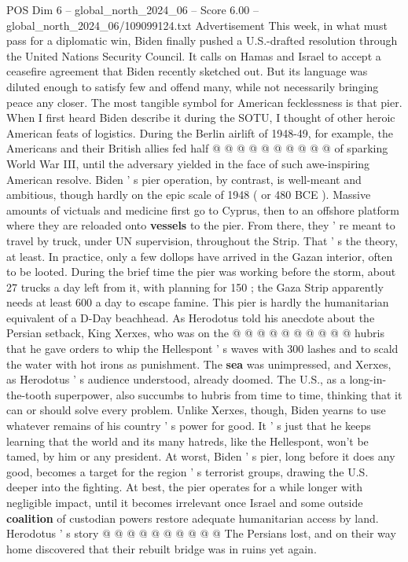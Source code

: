 \begin{textsample}{POS Dim 6 – global\_north\_2024\_06 – Score 6.00 – global\_north\_2024\_06/109099124.txt}
Advertisement This week, in what must pass for a diplomatic win, Biden finally pushed a U.S.-drafted resolution through the United Nations Security Council.
It calls on Hamas and Israel to accept a ceasefire agreement that Biden recently sketched out.
But its language was diluted enough to satisfy few and offend many, while not necessarily bringing peace any closer.
The most tangible symbol for American fecklessness is that pier.
When I first heard Biden describe it during the SOTU, I thought of other heroic American feats of logistics.
During the Berlin airlift of 1948-49, for example, the Americans and their British allies fed half @ @ @ @ @ @ @ @ @ @ of sparking World War III, until the adversary yielded in the face of such awe-inspiring American resolve.
Biden ' s pier operation, by contrast, is well-meant and ambitious, though hardly on the epic scale of 1948 ( or 480 BCE ).
Massive amounts of victuals and medicine first go to Cyprus, then to an offshore platform where they are reloaded onto \textbf{vessels} to the pier.
From there, they ' re meant to travel by truck, under UN supervision, throughout the Strip.
That ' s the theory, at least.
In practice, only a few dollops have arrived in the Gazan interior, often to be looted.
During the brief time the pier was working before the storm, about 27 trucks a day left from it, with planning for 150 ; the Gaza Strip apparently needs at least 600 a day to escape famine.
This pier is hardly the humanitarian equivalent of a D-Day beachhead.
As Herodotus told his anecdote about the Persian setback, King Xerxes, who was on the @ @ @ @ @ @ @ @ @ @ hubris that he gave orders to whip the Hellespont ' s waves with 300 lashes and to scald the water with hot irons as punishment.
The \textbf{sea} was unimpressed, and Xerxes, as Herodotus ' s audience understood, already doomed.
The U.S., as a long-in-the-tooth superpower, also succumbs to hubris from time to time, thinking that it can or should solve every problem.
Unlike Xerxes, though, Biden yearns to use whatever remains of his country ' s power for good.
It ' s just that he keeps learning that the world and its many hatreds, like the Hellespont, won't be tamed, by him or any president.
At worst, Biden ' s pier, long before it does any good, becomes a target for the region ' s terrorist groups, drawing the U.S. deeper into the fighting.
At best, the pier operates for a while longer with negligible impact, until it becomes irrelevant once Israel and some outside \textbf{coalition} of custodian powers restore adequate humanitarian access by land.
Herodotus ' s story @ @ @ @ @ @ @ @ @ @ The Persians lost, and on their way home discovered that their rebuilt bridge was in ruins yet again.

\end{textsample}
